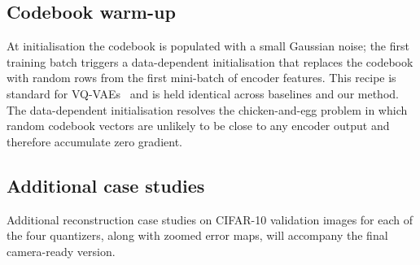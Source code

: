 \subsection{Codebook warm-up}

At initialisation the codebook is populated with a small Gaussian
noise; the first training batch triggers a data-dependent
initialisation that replaces the codebook with random rows from the
first mini-batch of encoder features. This recipe is standard for
VQ-VAEs~\citep{razavi2019vqvae2} and is held identical across
baselines and our method. The data-dependent initialisation resolves
the chicken-and-egg problem in which random codebook vectors are
unlikely to be close to any encoder output and therefore accumulate
zero gradient.

\subsection{Additional case studies}

Additional reconstruction case studies on CIFAR-10 validation images
for each of the four quantizers, along with zoomed error maps, will
accompany the final camera-ready version.
